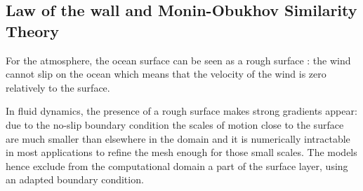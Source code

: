 \subsection{Law of the wall and Monin-Obukhov Similarity Theory}
For the atmosphere, the ocean surface can be seen as a
rough surface : the wind cannot slip on the ocean which
means that the velocity of the wind is zero
relatively to the surface.
\par
{}
\par
In fluid dynamics, the presence of a rough surface makes strong
gradients appear:
due to the no-slip boundary condition
the scales of motion close to the surface are much smaller than
elsewhere in the domain and it is numerically
intractable in most applications
to refine the mesh enough for those small scales.
The models hence exclude from the computational domain
a part of the surface layer, using an adapted boundary
condition.
%
